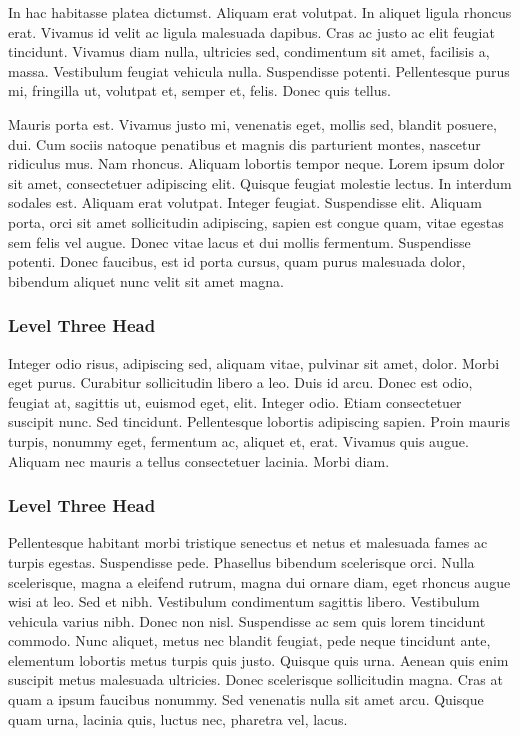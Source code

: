 In hac habitasse platea dictumst. Aliquam erat volutpat. In
aliquet ligula rhoncus erat. Vivamus id velit ac ligula malesuada
dapibus. Cras ac justo ac elit feugiat tincidunt. Vivamus diam
nulla, ultricies sed, condimentum sit amet, facilisis a, massa.
Vestibulum feugiat vehicula nulla. Suspendisse potenti.
Pellentesque purus mi, fringilla ut, volutpat et, semper et,
felis. Donec quis tellus.

Mauris porta est. Vivamus justo mi, venenatis eget, mollis sed,
blandit posuere, dui. Cum sociis natoque penatibus et magnis dis
parturient montes, nascetur ridiculus mus. Nam rhoncus. Aliquam
lobortis tempor neque. Lorem ipsum dolor sit amet, consectetuer
adipiscing elit. Quisque feugiat molestie lectus. In interdum
sodales est. Aliquam erat volutpat. Integer feugiat. Suspendisse
elit. Aliquam porta, orci sit amet sollicitudin adipiscing,
sapien est congue quam, vitae egestas sem felis vel augue. Donec
vitae lacus et dui mollis fermentum. Suspendisse potenti. Donec
faucibus, est id porta cursus, quam purus malesuada dolor,
bibendum aliquet nunc velit sit amet magna.

\subsubsection{Level Three Head}

Integer odio risus, adipiscing sed, aliquam vitae, pulvinar sit
amet, dolor. Morbi eget purus. Curabitur sollicitudin libero a
leo. Duis id arcu. Donec est odio, feugiat at, sagittis ut,
euismod eget, elit. Integer odio. Etiam consectetuer suscipit
nunc. Sed tincidunt. Pellentesque lobortis adipiscing sapien.
Proin mauris turpis, nonummy eget, fermentum ac, aliquet et,
erat. Vivamus quis augue. Aliquam nec mauris a tellus
consectetuer lacinia. Morbi diam.

\subsubsection{Level Three Head}

Pellentesque habitant morbi tristique senectus et netus et
malesuada fames ac turpis egestas. Suspendisse pede. Phasellus
bibendum scelerisque orci. Nulla scelerisque, magna a eleifend
rutrum, magna dui ornare diam, eget rhoncus augue wisi at leo.
Sed et nibh. Vestibulum condimentum sagittis libero. Vestibulum
vehicula varius nibh. Donec non nisl. Suspendisse ac sem quis
lorem tincidunt commodo. Nunc aliquet, metus nec blandit feugiat,
pede neque tincidunt ante, elementum lobortis metus turpis quis
justo. Quisque quis urna. Aenean quis enim suscipit metus
malesuada ultricies. Donec scelerisque sollicitudin magna. Cras
at quam a ipsum faucibus nonummy. Sed venenatis nulla sit amet
arcu. Quisque quam urna, lacinia quis, luctus nec, pharetra vel,
lacus.

